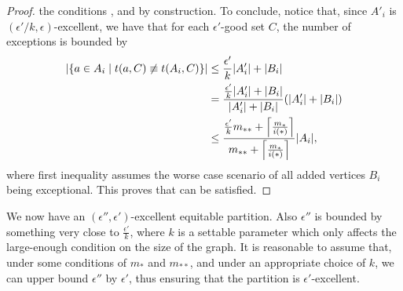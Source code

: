 \begin{lemma}
\begin{proof}
                the conditions
                ,
                 and
                 by construction.
                To conclude, notice that, since $A'_i$ is $(\epsilon'/k, \epsilon)$-excellent, we have that
                for each $\epsilon'$-good set $C$, the number of exceptions is bounded by
                \begin{align}
                    | \{ a \in A_i \mid t(a, C) \not\equiv t(A_i, C) \} |
                        & \leq \frac{\epsilon'}{k} | A_i' | + | B_i | \nonumber \\
                        & = \frac{\frac{\epsilon'}{k} | A_i' | + | B_i |}{| A_i' | + | B_i |}
                            ( | A_i' | + | B_i | ) \label{eq:paso_atras} \\
                        & \leq \frac{\frac{\epsilon'}{k} m_{**} + \left\lceil \frac{m_*}{i(*)} \right\rceil}{m_{**} + \left\lceil \frac{m_*}{i(*)} \right\rceil}
                            | A_i |, \nonumber
                \end{align}
                where first inequality assumes the worse case scenario of all added vertices $B_i$ being exceptional.
                This proves that  can be satisfied.
            \end{proof}
        \end{lemma}

        We now have an $(\epsilon'', \epsilon')$-excellent equitable partition.
        Also $\epsilon''$ is bounded by something very close to $\frac{\epsilon'}{k}$, where $k$ is a settable parameter
        which only affects the large-enough condition on the size of the graph.
        It is reasonable to assume that, under some conditions of $m_*$ and $m_{**}$, and under an appropriate choice of $k$,
        we can upper bound $\epsilon''$ by $\epsilon'$, thus ensuring that the partition is $\epsilon'$-excellent.

